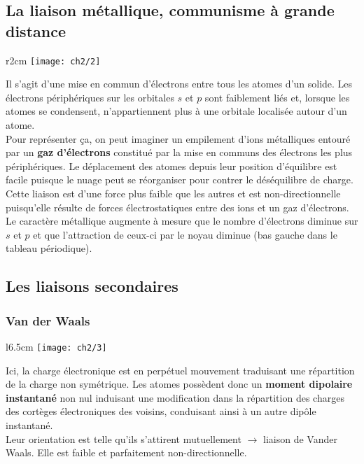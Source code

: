 	\subsection{La liaison métallique, communisme à grande distance}
		\begin{wrapfigure}[5]{r}{2cm}
		\vspace{-5mm}
		\texttt{[image: ch2/2]}
		\end{wrapfigure}
		Il s'agit d'une mise en commun d'électrons entre tous les atomes d'un solide. Les électrons périphériques sur les orbitales $s$ et $p$ sont faiblement liés et, lorsque les atomes se condensent, n'appartiennent plus à une orbitale localisée autour d'un atome. \\
		Pour représenter ça, on peut imaginer un empilement d'ions métalliques entouré par un \textbf{gaz d'électrons} constitué par la mise en communs des électrons les plus périphériques. Le déplacement des atomes depuis leur position d'équilibre est facile puisque le nuage peut se réorganiser pour contrer le déséquilibre de charge. \\
		Cette liaison est d'une force plus faible que les autres et est non-directionnelle puisqu'elle résulte de forces électrostatiques entre des ions et un gaz d'électrons. Le caractère métallique augmente à mesure que le nombre d'électrons diminue sur $s$ et $p$ et que l'attraction de ceux-ci par le noyau diminue (bas gauche dans le tableau périodique).
		
	\subsection{Les liaisons secondaires}
		\subsubsection{Van der Waals}  
			\begin{wrapfigure}[6]{l}{6.5cm}
			\vspace{-7mm}
			\texttt{[image: ch2/3]}
			\end{wrapfigure}
			Ici, la charge électronique est en perpétuel mouvement traduisant une répartition de la charge non symétrique. Les atomes possèdent donc un \textbf{moment dipolaire instantané} non nul induisant une modification dans la répartition des charges des cortèges électroniques des voisins, conduisant ainsi à un autre dipôle instantané. \\
			Leur orientation est telle qu'ils s'attirent mutuellement $\rightarrow$ liaison de Vander Waals. Elle est faible et parfaitement non-directionnelle.
			
